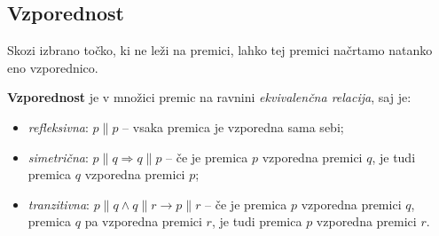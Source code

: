     \subsection*{Vzporednost}
            
            \begin{aksiom}
                Skozi izbrano točko, ki ne leži na premici, lahko tej premici načrtamo natanko eno vzporednico.

                \begin{figure}[H]

                \end{figure}

            \end{aksiom}

            
                \textbf{Vzporednost} je v množici premic na ravnini \textit{ekvivalenčna relacija}, saj je:
                \begin{itemize}
                    \item \textit{refleksivna}: $p\parallel p$ -- vsaka premica je vzporedna sama sebi;
                    \item \textit{simetrična}: $p\parallel q \Rightarrow q\parallel p$ -- če je premica $p$ vzporedna premici $q$, je tudi premica $q$ vzporedna premici $p$;
                    \item \textit{tranzitivna}: $p\parallel q \land q \parallel r \rightarrow p \parallel r$ -- če je premica $p$ vzporedna premici $q$, premica $q$ pa vzporedna premici $r$, 
                        je tudi premica $p$ vzporedna premici $r$.
                \end{itemize}

